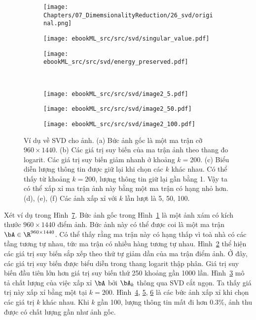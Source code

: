 \begin{figure}[t]
\begin{subfigure}{0.325\textwidth}
\texttt{[image: Chapters/07\_DimemsionalityReduction/26\_svd/original.png]}
\caption{}
\label{fig:26_3a}
\end{subfigure}
\begin{subfigure}{0.325\textwidth}
\texttt{[image: ebookML\_src/src/svd/singular\_value.pdf]}
\caption{}
\label{fig:26_3b}
\end{subfigure}
\begin{subfigure}{0.325\textwidth}
\texttt{[image: ebookML\_src/src/svd/energy\_preserved.pdf]}
\caption{}
\label{fig:26_3c}
\end{subfigure}
\\
\begin{subfigure}{0.325\textwidth}
\texttt{[image: ebookML\_src/src/svd/image2\_5.pdf]}
\caption{}
\label{fig:26_3d}
\end{subfigure}
\begin{subfigure}{0.325\textwidth}
\texttt{[image: ebookML\_src/src/svd/image2\_50.pdf]}
\caption{}
\label{fig:26_3e}
\end{subfigure}
\begin{subfigure}{0.325\textwidth}
\texttt{[image: ebookML\_src/src/svd/image2\_100.pdf]}
\caption{}
\label{fig:26_3f}
\end{subfigure}
\caption{
Ví dụ về SVD cho ảnh. (a) Bức ảnh gốc là một ma trận cỡ $960
\times 1440$. (b) Các giá trị suy biến của ma trận ảnh theo thang đo logarit. Các giá trị suy biến giảm nhanh ở khoảng $k = 200$.
(c) Biểu diễn lượng thông tin được giữ lại khi chọn các $k$ khác nhau. Có
thể thấy từ khoảng $k = 200$, lượng thông tin giữ lại gần bằng 1.
Vậy ta có thể xấp xỉ ma trận ảnh này bằng một ma trận có hạng nhỏ hơn. (d),
(e), (f) Các ảnh xấp xỉ với $k$ lần lượt là 5, 50, 100.
}
\label{fig:26_3}
\end{figure}

Xét ví dụ trong Hình~\ref{fig:26_3}. Bức ảnh gốc trong Hình~\ref{fig:26_3a} là
một ảnh xám có
kích thước
$960\times 1440$ điểm ảnh. Bức ảnh này có thể được coi là một ma trận $\bA \in
\R^{960\times 1440}$. Có thể thấy rằng ma trận này có hạng thấp vì toà nhà có các tầng tương tự nhau, tức ma trận có nhiều hàng tương tự nhau.
Hình~\ref{fig:26_3b} thể hiện các giá trị suy biến sắp xếp theo thứ tự giảm dần
của ma trận điểm ảnh. Ở đây, các giá trị suy biến được biểu diễn trong thang logarit thập phân. Giá trị suy biến đầu tiên lớn hơn giá trị suy biến thứ 250 khoảng gần 1000 lần. Hình~\ref{fig:26_3c} mô tả chất lượng của việc xấp xỉ $\bA$ bởi
$\bA_k$ thông qua SVD cắt ngọn. Ta thấy giá trị này xấp xỉ bằng một tại $k =
200$. Hình~\ref{fig:26_3d}, \ref{fig:26_3e}, \ref{fig:26_3f} là các bức ảnh xấp
xỉ khi chọn các giá trị $k$ khác nhau. Khi $k$ gần 100, lượng thông tin mất đi hơn 0.3\%, ảnh thu được có chất lượng gần như ảnh gốc.


